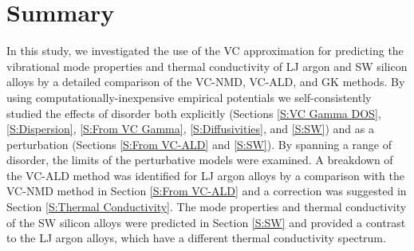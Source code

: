 


\section{\label{S:Summary}Summary}

In this study, we investigated the use of the VC 
approximation for predicting the vibrational mode properties and 
thermal conductivity of LJ argon and SW silicon alloys 
by a detailed comparison of the VC-NMD, VC-ALD, and GK methods. 
By using computationally-inexpensive  
empirical potentials we self-consistently studied the effects of 
disorder both explicitly (Sections \ref{S:VC Gamma DOS}, 
\ref{S:Dispersion},  
\ref{S:From VC Gamma}, \ref{S:Diffusivities}, and \ref{S:SW}) 
and as a perturbation (Sections \ref{S:From VC-ALD} and \ref{S:SW}). 
By spanning a range of disorder, the limits of the 
perturbative models were examined.
A breakdown of the VC-ALD method was identified for LJ argon alloys 
by a comparison with the VC-NMD method in 
Section \ref{S:From VC-ALD}   
and a correction was suggested in Section \ref{S:Thermal Conductivity}. 
The mode properties and thermal 
conductivity of the SW silicon alloys were predicted in 
Section \ref{S:SW} and provided a contrast to the 
LJ argon alloys, which have a different thermal conductivity 
spectrum. 

